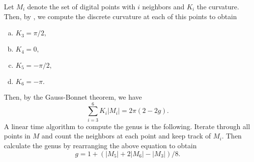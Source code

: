Let $M_i$ denote the set of digital points with $i$ neighbors and $K_i$
the curvature.
Then, by , we compute the discrete curvature
at each of this points to obtain
\begin{enumerate}[(a)]
\item $K_3=\pi/2,$
\item $K_4=0,$
\item $K_5=-\pi/2,$
\item $K_6=-\pi.$
\end{enumerate}

Then, by the Gauss-Bonnet theorem, we have
$$\sum_{i=3}^6K_i |M_i|=2\pi (2-2g).$$
A linear time algorithm to compute the genus is the following.
Iterate through all points in $M$ and count the neighbors at each point
and keep track of $M_i$. Then calculate the genus
by rearranging the above equation to obtain
$$g=1+(|M_5|+2|M_6|-|M_3|)/8.$$